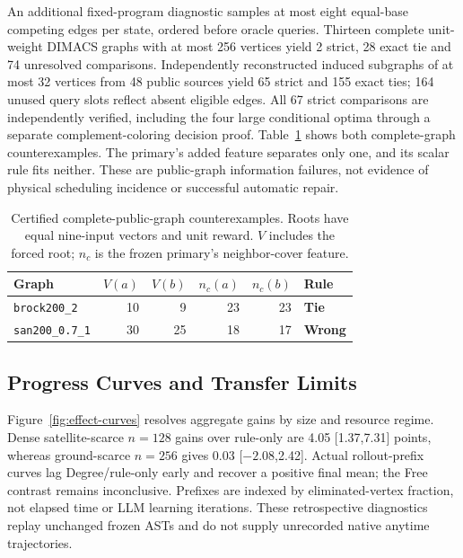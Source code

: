 An additional fixed-program diagnostic samples at most eight equal-base
competing edges per state, ordered before oracle queries. Thirteen complete
unit-weight DIMACS graphs with at most 256 vertices yield 2 strict, 28 exact
tie and 74 unresolved comparisons. Independently reconstructed induced
subgraphs of at most 32 vertices from 48 public sources yield
65 strict and 155 exact ties; 164
unused query slots reflect absent eligible edges. All 67 strict comparisons
are independently verified, including the four large conditional optima
through a separate complement-coloring decision proof.
Table~\ref{tab:public-conflicts} shows both complete-graph counterexamples.
The primary's added feature separates only one, and its scalar rule fits
neither. These are public-graph information failures, not evidence of
physical scheduling incidence or successful automatic repair.

\begin{table}[t]
\centering
\caption{Certified complete-public-graph counterexamples. Roots have equal
nine-input vectors and unit reward. $V$ includes the forced root;
$n_c$ is the frozen primary's neighbor-cover feature.}
\label{tab:public-conflicts}
\setlength{\tabcolsep}{3pt}
\begin{tabular}{lrrrrl}
\toprule
Graph & $V(a)$ & $V(b)$ & $n_c(a)$ & $n_c(b)$ & Rule \\
\midrule
\texttt{brock200\_2} & 10 & 9 & 23 & 23 & \textbf{Tie} \\
\texttt{san200\_0.7\_1} & 30 & 25 & 18 & 17 & \textbf{Wrong} \\
\bottomrule
\end{tabular}
\end{table}

\subsection{Progress Curves and Transfer Limits}
\label{sec:experiments:evidence}
Figure~\ref{fig:effect-curves} resolves aggregate gains by size and resource
regime. Dense satellite-scarce $n=128$ gains over rule-only are
4.05 [1.37,7.31] points, whereas ground-scarce $n=256$ gives
0.03 [$-2.08$,2.42]. Actual rollout-prefix curves lag Degree/rule-only early
and recover a positive final mean; the Free contrast remains inconclusive.
Prefixes are indexed by eliminated-vertex fraction, not elapsed time or LLM
learning iterations. These retrospective diagnostics replay unchanged frozen
ASTs and do not supply unrecorded native anytime trajectories.

